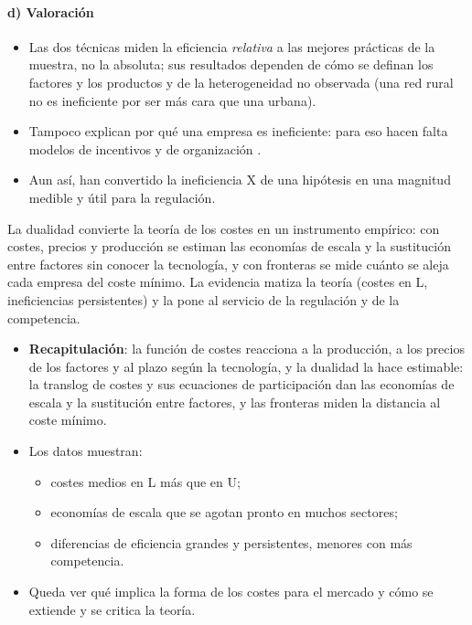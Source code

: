 \documentclass[11pt]{article}
\begin{document}
\paragraph{d) Valoración}

\begin{itemize}
\item Las dos técnicas miden la eficiencia \emph{relativa} a las mejores prácticas de la muestra, no la absoluta; sus resultados dependen de cómo se definan los factores y los productos y de la heterogeneidad no observada (una red rural no es ineficiente por ser más cara que una urbana).
\item Tampoco explican por qué una empresa es ineficiente: para eso hacen falta modelos de incentivos y de organización .
\item Aun así, han convertido la ineficiencia X de una hipótesis en una magnitud medible y útil para la regulación.
\end{itemize}

\begin{ideaclave}
La dualidad convierte la teoría de los costes en un instrumento empírico: con costes, precios y producción se estiman las economías de escala y la sustitución entre factores sin conocer la tecnología, y con fronteras se mide cuánto se aleja cada empresa del coste mínimo. La evidencia matiza la teoría (costes en L, ineficiencias persistentes) y la pone al servicio de la regulación y de la competencia.
\end{ideaclave}

\begin{itemize}
\item \textbf{Recapitulación}: la función de costes reacciona a la producción, a los precios de los factores y al plazo según la tecnología, y la dualidad la hace estimable: la translog de costes y sus ecuaciones de participación dan las economías de escala y la sustitución entre factores, y las fronteras miden la distancia al coste mínimo.
\item Los datos muestran:
  \begin{itemize}
  \item costes medios en L más que en U;
  \item economías de escala que se agotan pronto en muchos sectores;
  \item diferencias de eficiencia grandes y persistentes, menores con más competencia.
  \end{itemize}
\item Queda ver qué implica la forma de los costes para el mercado y cómo se extiende y se critica la teoría.
\end{itemize}
\end{document}
